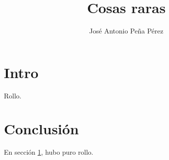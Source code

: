 \documentclass{article}
\title{Cosas raras}
\author{José Antonio Peña Pérez}
\begin{document}
\maketitle

\section{Intro}\label{intro}

Rollo.

\section{Conclusión}

En sección \ref{intro}, hubo puro rollo.
\end{document}
